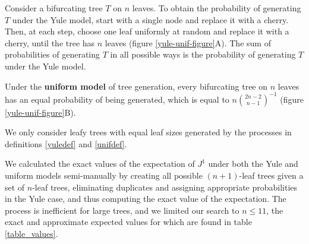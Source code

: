 \begin{definition}\label{yuledef}
    Consider a bifurcating tree $T$ on $n$ leaves. To obtain the probability of
    generating $T$ under the Yule model, start with a single node and replace it
    with a cherry. Then, at each step, choose one leaf uniformly at random and
    replace it with a cherry, until the tree has $n$ leaves (figure
    \ref{yule-unif-figure}A). The sum of probabilities of generating $T$ in all
    possible ways is the probability of generating $T$ under the Yule model.
\end{definition}

\begin{definition}\label{unifdef}
    Under the \textbf{uniform model} of tree generation, every bifurcating tree
    on $n$ leaves has an equal probability of being generated, which is equal to
    $n\binom{2n-2}{n-1}^{-1}$ (figure \ref{yule-unif-figure}B).
\end{definition}

\begin{remark}
    We only consider leafy trees with equal leaf sizes generated by the
    processes in definitions \ref{yuledef} and \ref{unifdef}.
\end{remark}

\begin{remark}
    We calculated the exact values of the expectation of $J^1$ under both the
    Yule and uniform models semi-manually by creating all possible $(n+1)$-leaf
    trees given a set of $n$-leaf trees, eliminating duplicates and assigning
    appropriate probabilities in the Yule case, and thus computing the exact
    value of the expectation. The process is inefficient for large trees, and
    we limited our search to $n\leq 11$, the exact and approximate expected
    values for which are found in table \ref{table_values}.
\end{remark}

